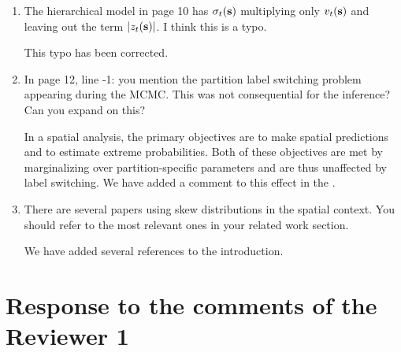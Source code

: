 \documentclass[11pt]{article}
\begin{document}
\begin{enumerate}[1.]
  \item The hierarchical model in page 10 has $\sigma_t(\mbox{\bf s})$ multiplying only $v_t(\mbox{\bf s})$ and leaving out the term $|z_t(\mbox{\bf s})|$. I think this is a typo. \\

  \begin{response}
    This typo has been corrected.
  \end{response}

  \item In page 12, line -1: you mention the partition label switching problem appearing during the MCMC. This was not consequential for the inference? Can you expand on this? \\

  \begin{response}
    In a spatial analysis, the primary objectives are to make spatial predictions and to estimate extreme probabilities.
    Both of these objectives are met by marginalizing over partition-specific parameters and are thus unaffected by label switching.
    We have added a comment to this effect in the .
  \end{response}

  \item There are several papers using skew distributions in the spatial context. You should refer to the most relevant ones in your related work section. \\

  \begin{response}
    We have added several references to the introduction.
  \end{response}

\end{enumerate}

\newpage
\section*{Response to the comments of the Reviewer 1}
\end{document}
